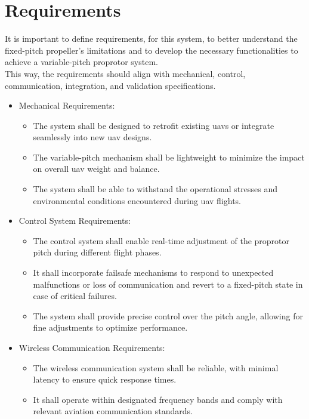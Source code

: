 \section{Requirements}
It is important to define requirements, for this system, to better understand the fixed-pitch propeller's limitations and to develop the necessary functionalities to achieve a variable-pitch proprotor system.\\
This way, the requirements should align with mechanical, control, communication, integration, and validation specifications.
\begin{itemize}
    \item Mechanical Requirements:
          \begin{itemize}
              \item The system shall be designed to retrofit existing \glspl{uav} or integrate seamlessly into new \gls{uav} designs.
              \item The variable-pitch mechanism shall be lightweight to minimize the impact on overall \gls{uav} weight and balance.
              \item The system shall be able to withstand the operational stresses and environmental conditions encountered during \gls{uav} flights.
          \end{itemize}
    \item Control System Requirements:
          \begin{itemize}
              \item The control system shall enable real-time adjustment of the proprotor pitch during different flight phases.
              \item It shall incorporate failsafe mechanisms to respond to unexpected malfunctions or loss of communication and revert to a fixed-pitch state in case of critical failures.
              \item The system shall provide precise control over the pitch angle, allowing for fine adjustments to optimize performance.
          \end{itemize}
    \item Wireless Communication Requirements:
          \begin{itemize}
              \item The wireless communication system shall be reliable, with minimal latency to ensure quick response times.
              \item It shall operate within designated frequency bands and comply with relevant aviation communication standards.

\end{itemize}
\end{itemize}
